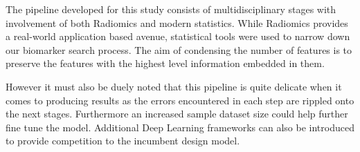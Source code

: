 \documentclass[10pt,journal,compsoc]{IEEEtran}
\begin{document}
The pipeline developed for this study consists of multidisciplinary stages with involvement of both Radiomics and modern statistics. While Radiomics provides a real-world application based avenue, statistical tools were used to narrow down our biomarker search process. The aim of condensing the number of features is to preserve the features with the highest level information embedded in them. 

However it must also be duely noted that this pipeline is quite delicate when it comes to producing results as the errors encountered in each step are rippled onto the next stages. Furthermore an increased sample dataset size could help further fine tune the model. Additional Deep Learning frameworks can also be introduced to provide competition to the incumbent design model.  
% 
% 
\end{document}

